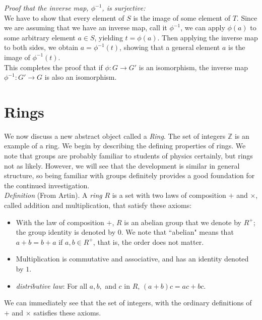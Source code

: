 \textit{Proof that the inverse map, $\phi^{-1}$, is surjective:}\\

We have to show that every element of $S$ is the image of some element of $T$.  Since we are assuming that we have an inverse map, call it $\phi^{-1}$, we can apply $\phi(a)$ to some arbitrary element $a \in S$, yielding $t=\phi(a)$.  Then applying the inverse map to both sides, we obtain $a = \phi^{-1}(t)$, showing that a general element $a$ is the image of $\phi^{-1}(t)$.\\

This completes the proof that if $\phi: G \rightarrow G'$ is an isomorphism, the inverse map $\phi^{-1}: G' \rightarrow G$ is also an isomorphism.\\

\section{Rings}

We now discuss a new abstract object called a \textit{Ring}.  The set of integers $\mathbb{Z}$ is an example of a ring.  We begin by describing the defining properties of rings.  We note that groups are probably familiar to students of physics certainly, but rings not as likely.  However, we will see that the development is similar in general structure, so being familiar with groups definitely provides a good foundation for the continued investigation.\\

\textit{Definition} (From Artin).  A \textit{ring} $R$ is a set with two laws of composition $+$ and $\times$, called addition and multiplication, that satisfy these axioms:\\

\begin{itemize}
\item With the law of composition $+$, $R$ is an abelian group that we denote by $R^{+}$;  the group identity is denoted by $0$.  We note that ``abelian" means that $a+b = b+a$ if $a,b \in R^{+}$, that is, the order does not matter.
\item Multiplication is commutative and associative, and has an identity denoted by $1$.
\item \textit{distributive law}: For all $a,b,$ and $c$ in $R$, $(a+b)c=ac+bc$.
\end{itemize}

We can immediately see that the set of integers, with the ordinary definitions of $+$ and $\times$ satisfies these axioms.\\

